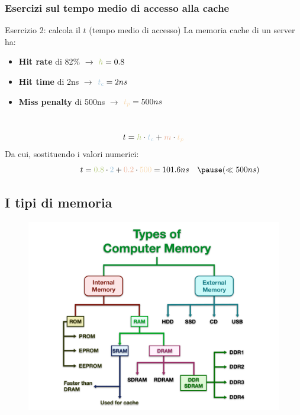 \begin{frame}
	\frametitle{Esercizi sul tempo medio di accesso alla cache}
	
	\begin{block}{Esercizio 2: calcola il $t$ (tempo medio di accesso)}
		La memoria cache di un server ha:
			\begin{itemize}
				\item \textbf{Hit rate} di 82\% \hspace{9.5em} $\rightarrow$ \hspace{2em} ${\color{CpuGreen}h} = 0.8$
				\item \textbf{Hit time} di 2ns \hspace{9.7em} $\rightarrow$ \hspace{2em} ${\color{CpuBlue}t_c} = 2ns$
				\item \textbf{Miss penalty} di 500ns \hspace{6.8em} $\rightarrow$ \hspace{2em} ${\color{CpuPink}t_p} = 500ns$
			\end{itemize}
		~\\ \pause
		$$t = {\color{CpuGreen}h} \cdot {\color{CpuBlue}t_c} + {\color{CpuRed}m} \cdot {\color{CpuPink}t_p}$$
		\pause
		Da cui, sostituendo i valori numerici:
		\pause
		$$\qquad \qquad t = {\color{CpuGreen}0.8} \cdot {\color{CpuBlue}2} + {\color{CpuRed}0.2} \cdot {\color{CpuPink}500} = 101.6ns \quad \pause (\ll 500ns)$$
	\end{block}

\end{frame}



\subsection[I tipi di memoria]{I tipi di memoria}
\begin{frame}
	\begin{figure}[!htbp] 
		\centering
		\includegraphics[width=0.95\linewidth]{images/5_memory/memory_types.pdf}
	\end{figure}
		
\end{frame}


